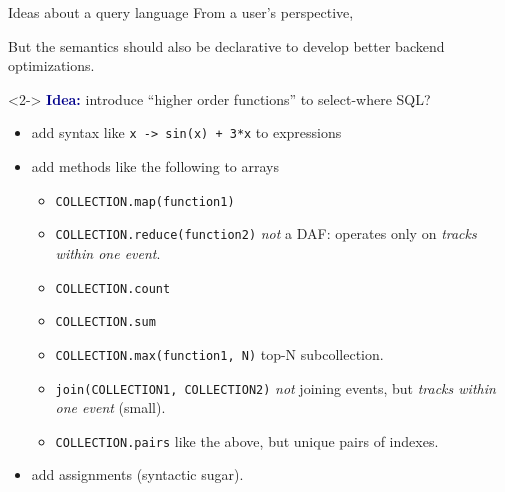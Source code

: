 \documentclass{beamer}
\begin{document}
\begin{frame}{Ideas about a query language}
\vspace{0.25 cm}
From a user's perspective, 






\vspace{0.25 cm}
But the semantics should also be declarative to develop better backend optimizations.

\vspace{0.25 cm}
\begin{uncoverenv}<2->
\textcolor{darkblue}{\bf Idea:} introduce ``higher order functions'' to select-where SQL?
\begin{itemize}
\item add syntax like {\tt x -> sin(x) + 3*x} to expressions
\item add methods like the following to arrays
\begin{itemize}
\item {\tt \scriptsize COLLECTION.map(function1)}
\item {\tt \scriptsize COLLECTION.reduce(function2)} {\it not} a DAF: operates only on {\it tracks within one event}.
\item {\tt \scriptsize COLLECTION.count}
\item {\tt \scriptsize COLLECTION.sum}
\item {\tt \scriptsize COLLECTION.max(function1, N)} top-N subcollection.
\item {\tt \scriptsize join(COLLECTION1, COLLECTION2)} {\it not} joining events, but {\it tracks within one event} (small).
\item {\tt \scriptsize COLLECTION.pairs} like the above, but unique pairs of indexes.
\end{itemize}
\item add assignments (syntactic sugar).
\end{itemize}
\end{uncoverenv}
\end{frame}
\end{document}
